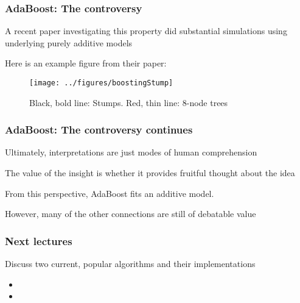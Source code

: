\documentclass[12pt]{beamer}
\begin{document}
\begin{frame}[fragile]
\frametitle{AdaBoost: The controversy}
A recent paper investigating this property did substantial simulations using underlying purely additive models

\vsp

Here is an example figure from their paper:
\begin{figure}
\centering
\texttt{[image: ../figures/boostingStump]}
\caption{Black, bold line: Stumps.  Red, thin line: 8-node trees}
\end{figure}

\end{frame}


\begin{frame}[fragile]
\frametitle{AdaBoost: The controversy continues}
Ultimately, interpretations are just modes of human comprehension

\vsp
The value of the insight is whether it provides fruitful thought about the idea

\vsp
From this perspective, AdaBoost fits an additive model.  

\vsp
However, many of the other connections are still of debatable value

\end{frame}


\begin{frame}[fragile]
\frametitle{Next lectures}
Discuss two current, popular algorithms and their  implementations
\vsp

\begin{itemize}
\item {}
\item {}
\end{itemize}
\end{frame}
\end{document}
